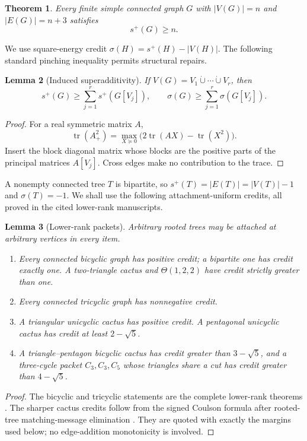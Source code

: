 \documentclass[11pt]{article}
\newtheorem{theorem}{Theorem}[section]
\newtheorem{lemma}[theorem]{Lemma}
\theoremstyle{remark}
\newcommand{\splus}{s^+}
\newcommand{\sig}{\sigma}
\begin{document}
\begin{theorem}\label{thm:main}
Every finite simple connected graph $G$ with $|V(G)|=n$ and
$|E(G)|=n+3$ satisfies
\[
 \boxed{\splus(G)\geq n}.
\]
\end{theorem}

We use square-energy credit $\sig(H)=\splus(H)-|V(H)|$.  The following
standard pinching inequality permits structural repairs.

\begin{lemma}[Induced superadditivity]\label{lem:super}
If $V(G)=V_1\mathbin{\dot\cup}\cdots\mathbin{\dot\cup}V_r$, then
\[
 \splus(G)\geq\sum_{j=1}^r\splus(G[V_j]),
 \qquad
 \sig(G)\geq\sum_{j=1}^r\sig(G[V_j]).
\]
\end{lemma}

\begin{proof}
For a real symmetric matrix $A$,
\[
 \operatorname{tr}(A_+^2)=
 \max_{X\succeq0}\bigl(2\operatorname{tr}(AX)-\operatorname{tr}(X^2)\bigr).
\]
Insert the block diagonal matrix whose blocks are the positive parts of the
principal matrices $A[V_j]$.  Cross edges make no contribution to the trace.
\end{proof}

A nonempty connected tree $T$ is bipartite, so
$\splus(T)=|E(T)|=|V(T)|-1$ and $\sig(T)=-1$.  We shall use the following
attachment-uniform credits, all proved in the cited lower-rank manuscripts.

\begin{lemma}[Lower-rank packets]\label{lem:packets}
Arbitrary rooted trees may be attached at arbitrary vertices in every item.
\begin{enumerate}
\item Every connected bicyclic graph has positive credit; a bipartite one has
credit exactly one.  A two-triangle cactus and $\Theta(1,2,2)$ have credit
strictly greater than one.
\item Every connected tricyclic graph has nonnegative credit.
\item A triangular unicyclic cactus has positive credit.  A pentagonal
unicyclic cactus has credit at least $2-\sqrt5$.
\item A triangle--pentagon bicyclic cactus has credit greater than
$3-\sqrt5$, and a three-cycle packet $C_3,C_3,C_5$ whose triangles share a
cut has credit greater than $4-\sqrt5$.
\end{enumerate}
\end{lemma}

\begin{proof}
The bicyclic and tricyclic statements are the complete lower-rank theorems
\cite{BicyclicGraphs,TricyclicGraphs}.  The sharper cactus credits follow from
the signed Coulson formula after rooted-tree matching-message elimination
\cite{TetracyclicCactus}.  They are quoted with exactly the margins used
below; no edge-addition monotonicity is involved.
\end{proof}
\end{document}
